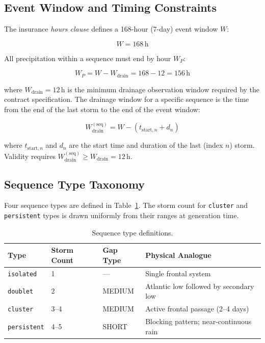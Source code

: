 \documentclass[11pt,a4paper]{article}
\begin{document}
\subsection{Event Window and Timing Constraints}

The insurance \emph{hours clause} defines a 168-hour (7-day) event window $W$:

\begin{equation}
  W = 168\,\text{h}
  \label{eq:event_window}
\end{equation}

All precipitation within a sequence must end by hour $W_P$:

\begin{equation}
  W_P = W - W_{\text{drain}} = 168 - 12 = 156\,\text{h}
  \label{eq:precip_window}
\end{equation}

\noindent where $W_{\text{drain}} = 12\,\text{h}$ is the minimum drainage observation
window required by the contract specification. The drainage window for a specific sequence
is the time from the end of the last storm to the end of the event window:

\begin{equation}
  W_{\text{drain}}^{(\text{seq})} = W - \left(t_{\text{start},n}
    + d_n\right)
  \label{eq:seq_drain}
\end{equation}

where $t_{\text{start},n}$ and $d_n$ are the start time and duration of the last
(index $n$) storm. Validity requires $W_{\text{drain}}^{(\text{seq})} \geq W_{\text{drain}} = 12\,\text{h}$.

\subsection{Sequence Type Taxonomy}

Four sequence types are defined in Table~\ref{tab:seq_types}. The storm count for
\texttt{cluster} and \texttt{persistent} types is drawn uniformly from their ranges
at generation time.

\begin{table}[H]
  \centering
  \caption{Sequence type definitions.}
  \label{tab:seq_types}
  \begin{tabular}{llll}
    \toprule
    \textbf{Type} & \textbf{Storm Count} & \textbf{Gap Type} & \textbf{Physical Analogue} \\
    \midrule
    \texttt{isolated}   & 1     & ---    & Single frontal system \\
    \texttt{doublet}    & 2     & MEDIUM & Atlantic low followed by secondary low \\
    \texttt{cluster}    & 3--4  & MEDIUM & Active frontal passage (2--4 days) \\
    \texttt{persistent} & 4--5  & SHORT  & Blocking pattern; near-continuous rain \\
    \bottomrule
  \end{tabular}
\end{table}
\end{document}
